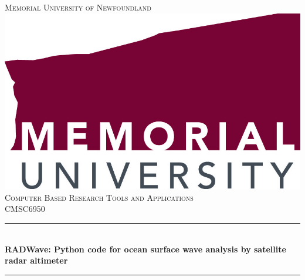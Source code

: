 \documentclass[12pt]{article}
\begin{document}
\begin{titlepage}

\newcommand{\HRule}{\rule{\linewidth}{0.5mm}} %

\center %
 

\textsc{ Memorial University of Newfoundland}\\[1.5cm] %
\includegraphics[scale=.1]{images/MUN_Logo.jpg}\\[1cm] %
\textsc{\Large Computer Based Research Tools and Applications}\\[0.5cm] %
\textsc{\large CMSC6950}\\[0.5cm] %


\HRule \\[0.4cm]
{ \huge \bfseries RADWave: Python code for ocean surface wave analysis by satellite radar altimeter}\\[0.4cm] %
\HRule \\[1.5cm]
 


\end{titlepage}
\end{document}
